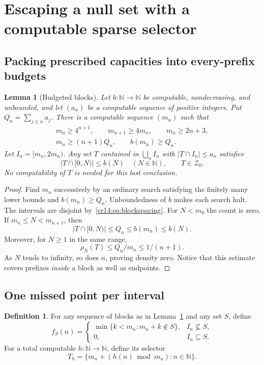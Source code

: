 \documentclass[11pt,a4paper]{article}
\newcommand{\N}{\mathbb N}
\newcommand{\Znull}{\mathcal Z_0}
\newtheorem{lemma}[theorem]{Lemma}
\theoremstyle{definition}
\newtheorem{definition}[theorem]{Definition}
\theoremstyle{remark}
\begin{document}
\section{Escaping a null set with a computable sparse selector}
\label{cr14:sec:escape}
\subsection{Packing prescribed capacities into every-prefix budgets}
\begin{lemma}[Budgeted blocks]\label{cr14:lem:blocks}
Let $b:\N\to\N$ be computable, nondecreasing, and unbounded, and let
$(a_n)$ be a computable sequence of positive integers. Put
$Q_n=\sum_{j\leq n}a_j$. There is a computable sequence $(m_n)$ such that
\begin{gather}
 m_n\geq4^{n+1},\qquad m_{n+1}\geq4m_n,\qquad m_n\geq2n+3,
 \label{cr14:eq:blockspacing}\\
 m_n\geq(n+1)Q_n,\qquad b(m_n)\geq Q_n.\label{cr14:eq:blockbudget}
\end{gather}
Let $I_n=[m_n,2m_n)$. Any set $T$ contained in $\bigcup_n I_n$ with
$|T\cap I_n|\leq a_n$ satisfies
\[
 |T\cap[0,N)|\leq b(N)\quad(N\in\N),\qquad T\in\Znull.
\]
No computability of $T$ is needed for this last conclusion.
\end{lemma}
\begin{proof}
Find $m_n$ successively by an ordinary search satisfying the finitely many
lower bounds and $b(m_n)\geq Q_n$. Unboundedness of $b$ makes each search
halt. The intervals are disjoint by~\eqref{cr14:eq:blockspacing}.
For $N<m_0$ the count is zero. If $m_n\leq N<m_{n+1}$, then
\[
 |T\cap[0,N)|\leq Q_n\leq b(m_n)\leq b(N).
\]
Moreover, for $N\geq1$ in the same range,
\[
 \rho_N(T)\leq Q_n/m_n\leq1/(n+1).
\]
As $N$ tends to infinity, so does $n$, proving density zero. Notice that
this estimate covers prefixes \emph{inside} a block as well as endpoints.
\end{proof}

\subsection{One missed point per interval}
\begin{definition}
For any sequence of blocks as in Lemma~\ref{cr14:lem:blocks} and any set $S$,
define
\begin{equation}\label{cr14:eq:choice}
 f_S(n)=
 \begin{cases}
 \min\{k<m_n:m_n+k\notin S\},&I_n\nsubseteq S,\\
 0,&I_n\subseteq S.
 \end{cases}
\end{equation}
For a total computable $h:\N\to\N$, define its selector
\begin{equation}\label{cr14:eq:selector}
 T_h=\{m_n+(h(n)\bmod m_n):n\in\N\}.
\end{equation}
\end{definition}
\end{document}
